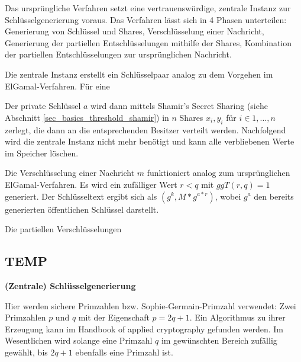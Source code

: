 Das ursprüngliche Verfahren setzt eine vertrauenswürdige, zentrale Instanz zur Schlüsselgenerierung voraus. Das Verfahren lässt sich in 4 Phasen unterteilen: Generierung von Schlüssel und Shares, Verschlüsselung einer Nachricht, Generierung der partiellen Entschlüsselungen mithilfe der Shares, Kombination der partiellen Entschlüsselungen zur ursprünglichen Nachricht. 


Die zentrale Instanz erstellt ein Schlüsselpaar analog zu dem Vorgehen im ElGamal-Verfahren. Für eine 

Der private Schlüssel \(a\) wird dann mittels Shamir's Secret Sharing (siehe Abschnitt \ref{sec_basics_threshold_shamir}) in \(n\) Shares \(x_i, y_i\) für \(i \in {1, \dots, n}\) zerlegt, die dann an die entsprechenden Besitzer verteilt werden. Nachfolgend wird die zentrale Instanz nicht mehr benötigt und kann alle verbliebenen Werte im Speicher löschen.


Die Verschlüsselung einer Nachricht \(m\) funktioniert analog zum ursprünglichen ElGamal-Verfahren. Es wird ein zufälliger Wert \(r < q\) mit \(ggT(r,q) = 1\) generiert. Der Schlüsseltext ergibt sich als \((g^k, M * g^{a*r})\), wobei \(g^a\) den bereits generierten öffentlichen Schlüssel darstellt.


Die partiellen Verschlüsselungen 





\subsection{TEMP}



\textbf{(Zentrale) Schlüsselgenerierung }

Hier werden sichere Primzahlen bzw. Sophie-Germain-Primzahl verwendet: Zwei Primzahlen \(p\) und \(q\) mit der Eigenschaft \(p = 2q + 1\). Ein Algorithmus zu ihrer Erzeugung kann im Handbook of applied cryptography gefunden werden.  Im Wesentlichen wird solange eine Primzahl \(q\) im gewünschten Bereich zufällig gewählt, bis \(2q + 1\) ebenfalls eine Primzahl ist.

